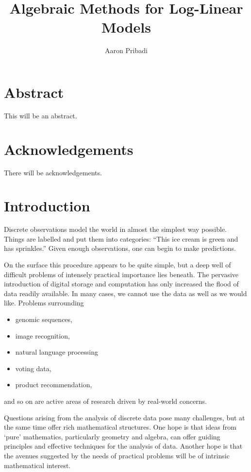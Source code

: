 \documentclass[cclicense]{hmcthesis}
\title{Algebraic Methods for Log-Linear Models}
\author{Aaron Pribadi}
\numberwithin{equation}{chapter}
\numberwithin{thmcounter}{chapter}
\begin{document}
\frontmatter

\maketitle

\tableofcontents



\chapter{Abstract}
    This will be an abstract.

\chapter{Acknowledgements}
    There will be acknowledgements.

\mainmatter

\chapter{Introduction}

    Discrete observations model the world in almost the simplest way possible.
    Things are labelled and put them into categories: ``This ice cream is green
    and has sprinkles.''  Given enough observations, one can begin to make
    predictions.
    
    On the surface this procedure appears to be quite simple, but a deep well of
    difficult problems of intensely practical importance lies beneath.  The
    pervasive introduction of digital storage and computation has only increased
    the flood of data readily available.  In many cases, we cannot use the data
    as well as we would like.  Problems surrounding
    \begin{itemize}\noparspace
    \item genomic sequences,
    \item image recognition,
    \item natural language processing
    \item voting data,
    \item product recommendation,
    \end{itemize}
    and so on are active areas of research driven by real-world concerns.

    Questions arising from the analysis of discrete data pose many challenges,
    but at the same time offer rich mathematical structures.  One hope is that
    ideas from `pure' mathematics, particularly geometry and algebra, can offer
    guiding principles and effective techniques for the analysis of data.
    Another hope is that the avenues suggested by the needs of practical
    problems will be of intrinsic mathematical interest.
    
\end{document}
